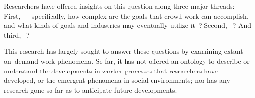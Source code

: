 \documentclass[trackingWork]{subfiles}
\begin{document}
Researchers have offered insights on this question along three major threads:
First,  ---
specifically, how complex are the goals that crowd work can accomplish, and
what kinds of goals and industries may eventually utilize it~\cite{suzukiAtelier,KimStoria,yuanAlmost,YuEncouragingOutside,Nebeling:2016:WCW:2858036.2858169,Hahn:2016:KAB:2858036.2858364}?
Second, ~\cite{sensitiveTasks,LykourentzouPersonalityMatters,Law:2016:CKC:2858036.2858144,Chang:2016:ACC:2858036.2858411,Newell:2016:OMA:2858036.2858490}?
And third, ~\cite{turkopticon,storiesIraniSilberman,crowdcollab,takingAHITMcInnis}?

This research has largely sought to answer these questions by examining extant on--demand work phenomena.
So far, it has not offered an ontology to describe or understand
the developments in worker processes that researchers have developed, or
the emergent phenomena in social environments;
nor has any research
gone so far as to anticipate future developments.
\end{document}
